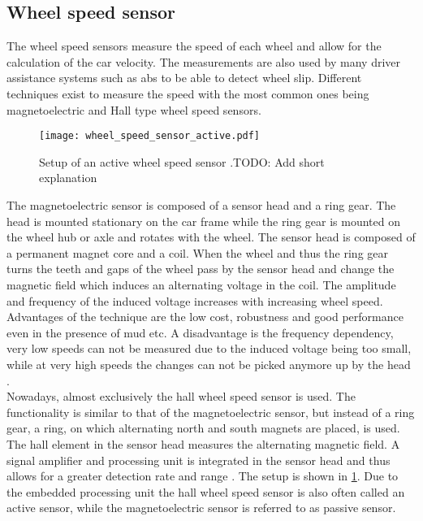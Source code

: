 \subsection{Wheel speed sensor}
The wheel speed sensors measure the speed of each wheel and allow for the calculation of the car velocity.
The measurements are also used by many driver assistance systems such as \gls{abs} to be able to detect wheel slip.
Different techniques exist to measure the speed with the most common ones being magnetoelectric and Hall type wheel speed sensors.\\
\begin{figure}[htb]
	\centering
	\texttt{[image: wheel\_speed\_sensor\_active.pdf]}
	\caption[Setup of an active wheel speed sensor]{Setup of an active wheel speed sensor \cite{Re2011}.\color{red}TODO: Add short explanation}
	\label{fig:wheel_speed_sensor_active}
\end{figure}
The magnetoelectric sensor is composed of a sensor head and a ring gear.
The head is mounted stationary on the car frame while the ring gear is mounted on the wheel hub or axle and rotates with the wheel.
The sensor head is composed of a permanent magnet core and a coil.
When the wheel and thus the ring gear turns the teeth and gaps of the wheel pass by the sensor head and change the magnetic field which induces an alternating voltage in the coil.
The amplitude and frequency of the induced voltage increases with increasing wheel speed.
Advantages of the technique are the low cost, robustness and good performance even in the presence of mud etc.
A disadvantage is the frequency dependency, very low speeds can not be measured due to the induced voltage being too small, while at very high speeds the changes can not be picked anymore up by the head \cite{AutoReif2014}.\\
Nowadays, almost exclusively the hall wheel speed sensor is used.
The functionality is similar to that of the magnetoelectric sensor, but instead of a ring gear, a ring, on which alternating north and south magnets are placed, is used.
The hall element in the sensor head measures the alternating magnetic field.
A signal amplifier and processing unit is integrated in the sensor head and thus allows for a greater detection rate and range \cite{Re2011}.
The setup is shown in \cref{fig:wheel_speed_sensor_active}.
Due to the embedded processing unit the hall wheel speed sensor is also often called an active sensor, while the magnetoelectric sensor is referred to as passive sensor.



